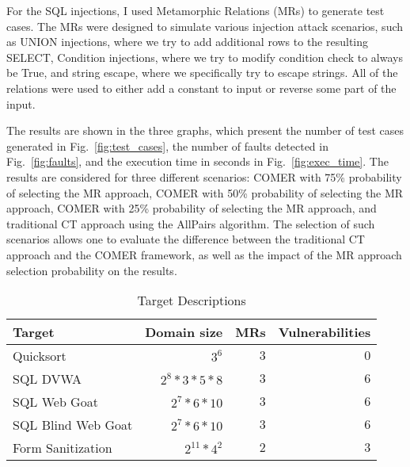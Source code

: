 For the SQL injections, I used Metamorphic Relations (MRs) to generate test cases. The MRs were designed to simulate various injection attack scenarios, such as UNION injections, where we try to add additional rows to the resulting SELECT, Condition injections, where we try to modify condition check to always be True, and string escape, where we specifically try to escape strings. All of the relations were used to either add a constant to input or reverse some part of the input.

The results are shown in the three graphs, which present the number of test cases generated in Fig.~\ref{fig:test_cases}, the number of faults detected in Fig.~\ref{fig:faults}, and the execution time in seconds in Fig.~\ref{fig:exec_time}. The results are considered for three different scenarios: COMER with 75\% probability of selecting the MR approach, COMER with 50\% probability of selecting the MR approach, COMER with 25\% probability of selecting the MR approach, and traditional CT approach using the AllPairs algorithm. The selection of such scenarios allows one to evaluate the difference between the traditional CT approach and the COMER framework, as well as the impact of the MR approach selection probability on the results.

\begin{table}[htbp]
  \centering
  \caption{Target Descriptions}
  \begin{tabular}{lrrr}
    \toprule
    Target & Domain size & MRs & Vulnerabilities \\
    \midrule
    Quicksort & $3^6$ & $3$ & $0$ \\
    SQL DVWA & $2^8*3*5*8$ & $3$ & $6$ \\
    SQL Web Goat & $2^7*6*10$ & $3$ & $6$ \\
    SQL Blind Web Goat & $2^7*6*10$ & $3$ & $6$ \\
    Form Sanitization & $2^{11} * 4^2$ & $2$ & $3$ \\
    \bottomrule
  \end{tabular}
  \label{fig:injections}
\end{table}


